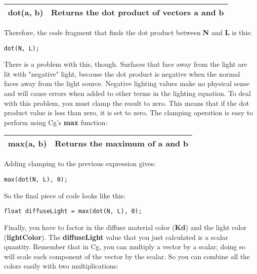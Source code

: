 \documentclass[../main.tex]{subfiles}
\begin{document}
\FloatBarrier
\begin{table}
\centering
\begin{tabular}{ p{5cm} p{7cm}  } 
\hline
\textbf{dot(a, b)} & Returns the dot product of vectors \textbf{a} and \textbf{b} \\
\hline
\end{tabular}
\end{table}
\FloatBarrier

Therefore, the code fragment that finds the dot product between \textbf{N} and \textbf{L} is this:

\FloatBarrier
\begin{lstlisting}
dot(N, L);
\end{lstlisting}
\FloatBarrier

There is a problem with this, though. Surfaces that face away from the light are lit with "negative" light, because the dot product is negative when the normal faces away from the light source. Negative lighting values make no physical sense and will cause errors when added to other terms in the lighting equation. To deal with this problem, you must clamp the result to zero. This means that if the dot product value is less than zero, it is set to zero. The clamping operation is easy to perform using Cg's \textbf{max} function:

\FloatBarrier
\begin{table}
\centering
\begin{tabular}{ p{5cm} p{7cm}  } 
\hline
\textbf{max(a, b)} & Returns the maximum of \textbf{a} and \textbf{b} \\
\hline
\end{tabular}
\end{table}
\FloatBarrier

Adding clamping to the previous expression gives:

\FloatBarrier
\begin{lstlisting}
max(dot(N, L), 0);
\end{lstlisting}
\FloatBarrier

So the final piece of code looks like this:

\FloatBarrier
\begin{lstlisting}
float diffuseLight = max(dot(N, L), 0);
\end{lstlisting}
\FloatBarrier

Finally, you have to factor in the diffuse material color (\textbf{Kd}) and the light color (\textbf{lightColor}). The \textbf{diffuseLight} value that you just calculated is a scalar quantity. Remember that in Cg, you can multiply a vector by a scalar; doing so will scale each component of the vector by the scalar. So you can combine all the colors easily with two multiplications:
\end{document}
